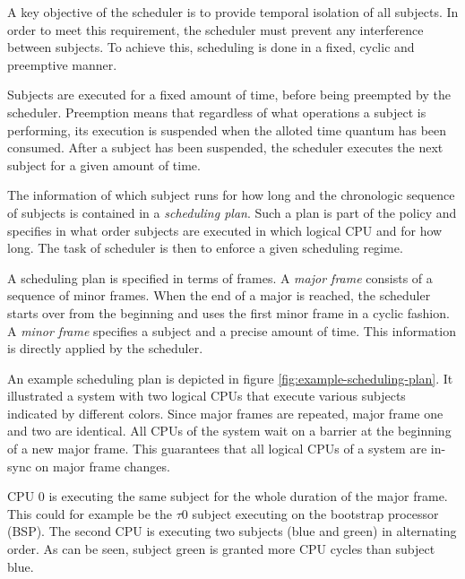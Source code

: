 A key objective of the scheduler is to provide temporal isolation of all
subjects. In order to meet this requirement, the scheduler must prevent any
interference between subjects. To achieve this, scheduling is done in a fixed,
cyclic and preemptive manner.

Subjects are executed for a fixed amount of time, before being preempted by the
scheduler. Preemption means that regardless of what operations a subject is
performing, its execution is suspended when the alloted time quantum has been
consumed. After a subject has been suspended, the scheduler executes the next
subject for a given amount of time.

The information of which subject runs for how long and the chronologic sequence
of subjects is contained in a \emph{scheduling plan}.
Such a plan is part of the policy and specifies in what order subjects are
executed in which logical CPU and for how long. The task of scheduler is then to
enforce a given scheduling regime.

A scheduling plan is specified in terms of frames. A \emph{major frame}
 consists of a sequence of minor frames. When the end of a
major is reached, the scheduler starts over from the beginning and uses the
first minor frame in a cyclic fashion. A \emph{minor frame}
specifies a subject and a precise amount of time. This information is directly
applied by the scheduler.

An example scheduling plan is depicted in figure
\ref{fig:example-scheduling-plan}. It illustrated a system with two logical CPUs
that execute various subjects indicated by different colors. Since major frames
are repeated, major frame one and two are identical. All CPUs of the system
wait on a barrier at the beginning of a new major frame. This guarantees that
all logical CPUs of a system are in-sync on major frame changes.

CPU 0 is executing the same subject for the whole duration of the major frame.
This could for example be the $\tau$0 subject executing on the bootstrap
processor (BSP). The second CPU is executing two subjects (blue and green) in
alternating order. As can be seen, subject green is granted more CPU cycles than
subject blue.

